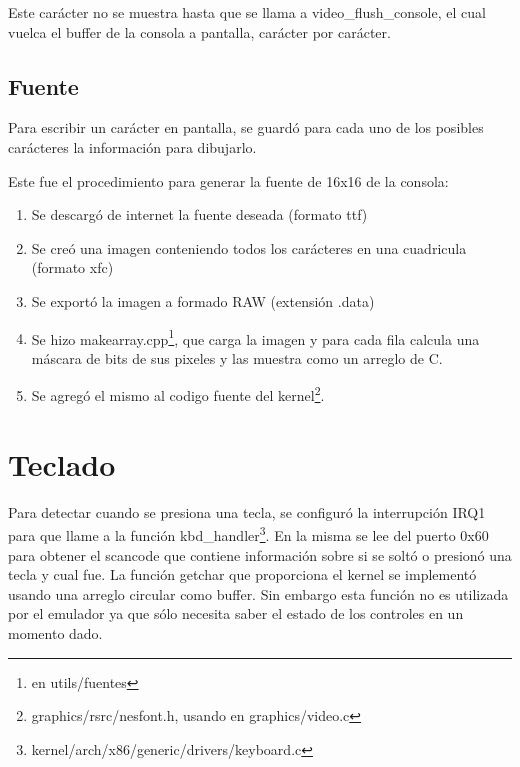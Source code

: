 
Este carácter no se muestra hasta que se llama a video\_flush\_console, el cual vuelca el buffer de la consola a pantalla, carácter por carácter.

\subsection{Fuente}
Para escribir un carácter en pantalla, se guardó para cada uno de los posibles carácteres la información para dibujarlo.

\setlength\fboxsep{10pt}
\setlength\fboxrule{0pt}

Este fue el procedimiento para generar la fuente de 16x16 de la consola:
\begin{enumerate}
\item Se descargó de internet la fuente deseada (formato ttf)
\item Se creó una imagen conteniendo todos los carácteres en una cuadricula (formato xfc)
\item Se exportó la imagen a formado RAW (extensión .data)
\item Se hizo makearray.cpp\footnote{en utils/fuentes}, que carga la imagen y para cada fila calcula una máscara de bits de sus pixeles y las muestra como un arreglo de C.
\item Se agregó el mismo al codigo fuente del kernel\footnote{graphics/rsrc/nesfont.h, usando en graphics/video.c}.	
\end{enumerate}

\section{Teclado}\label{sec:teclado}
Para detectar cuando se presiona una tecla, se configuró la interrupción IRQ1 para que llame a la función kbd\_handler\footnote{kernel/arch/x86/generic/drivers/keyboard.c}. En la misma se lee del puerto 0x60 para obtener el scancode que contiene información sobre si se soltó o presionó una tecla y cual fue.
La función getchar que proporciona el kernel se implementó usando una arreglo circular como buffer. Sin embargo esta función no es utilizada por el emulador ya que sólo necesita saber el estado de los controles en un momento dado.


